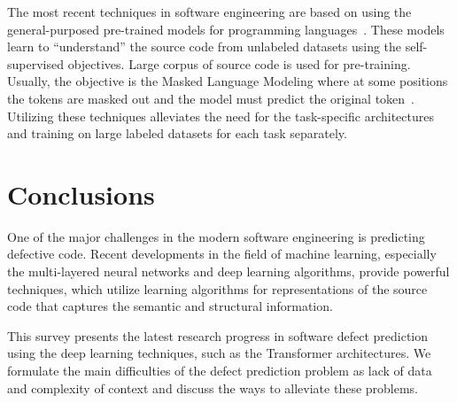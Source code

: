 \documentclass[mathematics,review,submit,moreauthors,pdftex]{Definitions/mdpi}
\begin{document}
The most recent techniques in software engineering are based on using the general-purposed pre-trained models for programming languages~\cite{karampatsis2020scelmo,guo2021graphcodebert}. These models learn to ``understand'' the source code from unlabeled datasets using the self-supervised objectives. Large corpus of source code is used for pre-training. Usually, the objective is the Masked Language Modeling where at some positions the tokens are masked out and the model must predict the original token~\cite{FengEtAl2020}. 
Utilizing these techniques alleviates the need for the task-specific architectures and training on large labeled datasets for each task separately.


\section{Conclusions} \label{sec_6}

One of the major challenges in the modern software engineering is predicting defective code. Recent developments in the field of machine learning, especially the multi-layered neural networks and deep learning algorithms, provide powerful techniques, which utilize learning algorithms for representations of the source code that captures the semantic and structural information. 

This survey presents the latest research progress in software defect prediction using the deep learning techniques, such as the Transformer architectures. We formulate the main difficulties of the defect prediction problem as lack of data and complexity of context and discuss the ways to alleviate these problems.
\end{document}
